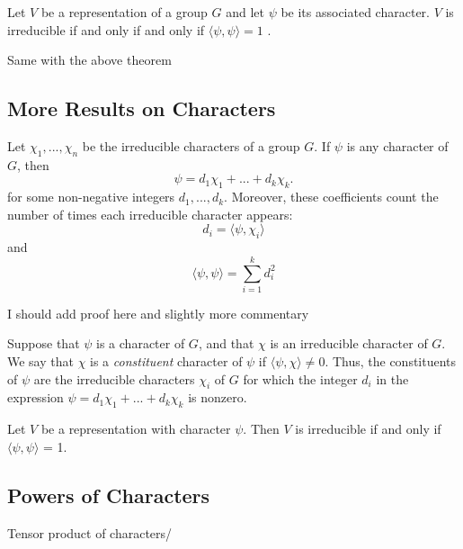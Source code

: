 \begin{theorem}
    Let $V$ be a representation of a group $G$ and let $\psi$ be its associated character.  $V$ is irreducible if 
    and only if and only if $\langle \psi, \psi \rangle = 1$ .
\end{theorem}
Same with the above theorem


\subsection{More Results on Characters}

\begin{theorem}
    Let $\chi_1, ..., \chi_n$ be the irreducible characters of a group $G$. If $\psi$ is any character of $G$, then 
    \[
        \psi = d_1\chi_1 + ... + d_k\chi_k.
    \]
    for some non-negative integers $d_1, ..., d_k$. Moreover, these coefficients count the number of times each 
    irreducible character appears:
    \[
        d_i = \langle \psi, \chi_i \rangle
    \]
    and
    \[
        \langle \psi, \psi \rangle = \sum_{i=1}^k d_i^2
    \]
\end{theorem}

I should add proof here and slightly more commentary


\begin{definition}
    Suppose that $\psi$ is a character of $G$, and that $\chi$ is an irreducible character of $G$. We say that 
    $\chi$ is a \emph{constituent} character of $\psi$ if $\langle \psi, \chi \rangle \neq 0$. Thus, the 
    constituents of $\psi$ are the irreducible characters $\chi_i$ of $G$ for which the integer $d_i$ in the 
    expression $\psi = d_1\chi_1 + ... + d_k\chi_k$ is nonzero.
\end{definition}


\begin{theorem}
    Let $V$ be a representation with character $\psi$. Then $V$ is irreducible if and only if $\langle \psi , \psi 
    \rangle$ = 1.
\end{theorem}



\subsection{Powers of Characters}

\begin{definition}
    Tensor product of characters/
\end{definition}

